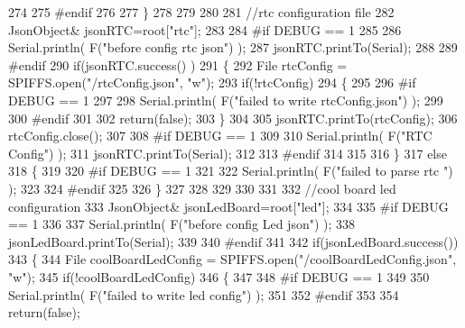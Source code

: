 \begin{DoxyCode}
274     
275 \textcolor{preprocessor}{    #endif}
276 
277     \}
278     
279     
280     
281     \textcolor{comment}{//rtc configuration file}
282         JsonObject& jsonRTC=root[\textcolor{stringliteral}{"rtc"}];
283 
284 \textcolor{preprocessor}{#if DEBUG == 1 }
285     
286     Serial.println( F(\textcolor{stringliteral}{"before config rtc json"}) );
287     jsonRTC.printTo(Serial);
288 
289 \textcolor{preprocessor}{#endif}
290     \textcolor{keywordflow}{if}(jsonRTC.success() )
291     \{
292         File rtcConfig = SPIFFS.open(\textcolor{stringliteral}{"/rtcConfig.json"}, \textcolor{stringliteral}{"w"});   
293         \textcolor{keywordflow}{if}(!rtcConfig)
294         \{
295         
296 \textcolor{preprocessor}{        #if DEBUG == 1 }
297 
298             Serial.println( F(\textcolor{stringliteral}{"failed to write rtcConfig.json"}) );
299 
300 \textcolor{preprocessor}{        #endif}
301 
302             \textcolor{keywordflow}{return}(\textcolor{keyword}{false});
303         \}
304 
305         jsonRTC.printTo(rtcConfig);
306         rtcConfig.close();
307 
308 \textcolor{preprocessor}{    #if DEBUG == 1 }
309 
310         Serial.println( F(\textcolor{stringliteral}{"RTC Config"}) );
311         jsonRTC.printTo(Serial);
312     
313 \textcolor{preprocessor}{    #endif}
314 
315     
316     \}
317     \textcolor{keywordflow}{else}
318     \{
319     
320 \textcolor{preprocessor}{    #if DEBUG == 1 }
321 
322         Serial.println( F(\textcolor{stringliteral}{"failed to parse rtc "}) );
323     
324 \textcolor{preprocessor}{    #endif}
325 
326     \}
327 
328     
329     
330     
331     
332         \textcolor{comment}{//cool board led configuration}
333         JsonObject& jsonLedBoard=root[\textcolor{stringliteral}{"led"}];
334     
335 \textcolor{preprocessor}{#if DEBUG == 1 }
336 
337     Serial.println( F(\textcolor{stringliteral}{"before config Led json"}) );
338     jsonLedBoard.printTo(Serial);
339 
340 \textcolor{preprocessor}{#endif}
341 
342     \textcolor{keywordflow}{if}(jsonLedBoard.success())
343     \{   
344         File coolBoardLedConfig = SPIFFS.open(\textcolor{stringliteral}{"/coolBoardLedConfig.json"}, \textcolor{stringliteral}{"w"}); 
345         \textcolor{keywordflow}{if}(!coolBoardLedConfig)
346         \{
347         
348 \textcolor{preprocessor}{        #if DEBUG == 1 }
349         
350             Serial.println( F(\textcolor{stringliteral}{"failed to write led config"}) );
351         
352 \textcolor{preprocessor}{        #endif}
353 
354             \textcolor{keywordflow}{return}(\textcolor{keyword}{false});

\end{DoxyCode}
